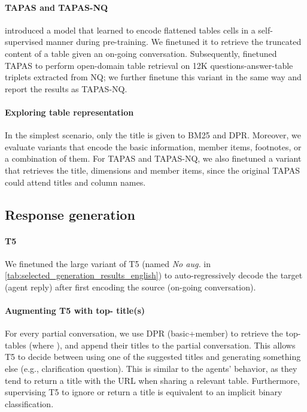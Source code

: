 \documentclass[11pt]{article}
\begin{document}
\paragraph{TAPAS and TAPAS-NQ} \citet{herzig_tapas_2020} introduced a model that learned to encode flattened tables cells in a self-supervised manner during pre-training. We finetuned it to retrieve the truncated content of a table given an on-going conversation. Subsequently, \citet{herzig_open_2021} finetuned TAPAS to perform open-domain table retrieval on 12K questions-answer-table triplets extracted from NQ; we further finetune this variant in the same way and report the results as TAPAS-NQ.

\paragraph{Exploring table representation} In the simplest scenario, only the title is given to BM25 and DPR. Moreover, we evaluate variants that encode the basic information, member items, footnotes, or a combination of them. For TAPAS and TAPAS-NQ, we also finetuned a variant that retrieves the title, dimensions and member items, since the original TAPAS could attend titles and column names.

\subsection{Response generation}

\paragraph{T5} We finetuned the large variant of T5 \citep{raffel_exploring_2020} (named \textit{No aug.} in \autoref{tab:selected_generation_results_english}) to auto-regressively decode the target (agent reply) after first encoding the source (on-going conversation).

\paragraph{Augmenting T5 with top- title(s)} For every partial conversation, we use DPR (basic+member) to retrieve the top- tables (where ), and append their titles to the partial conversation. This allows T5 to decide between using one of the suggested titles and generating something else (e.g., clarification question). This is similar to the agents' behavior, as they tend to return a title with the URL when sharing a relevant table. Furthermore, supervising T5 to ignore or return a title is equivalent to an implicit binary classification.
\end{document}
